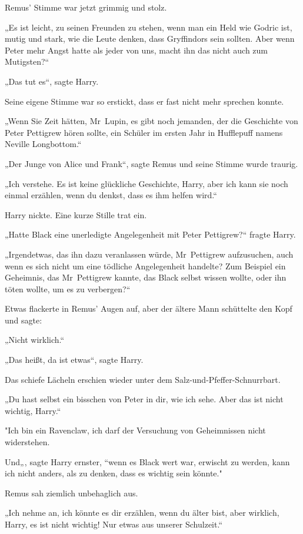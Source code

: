 {Remus' Stimme war jetzt grimmig und stolz.

„Es ist leicht, zu seinen Freunden zu stehen, wenn man ein Held wie Godric ist, mutig und stark, wie die Leute denken, dass Gryffindors sein sollten. Aber wenn Peter mehr Angst hatte als jeder von uns, macht ihn das nicht auch zum Mutigsten?“

„Das tut es“, sagte Harry.

Seine eigene Stimme war so erstickt, dass er fast nicht mehr sprechen konnte.

„Wenn Sie Zeit hätten, Mr~Lupin, es gibt noch jemanden, der die Geschichte von Peter Pettigrew hören sollte, ein Schüler im ersten Jahr in Hufflepuff namens Neville Longbottom.“

„Der Junge von Alice und Frank“, sagte Remus und seine Stimme wurde traurig.

„Ich verstehe. Es ist keine glückliche Geschichte, Harry, aber ich kann sie noch einmal erzählen, wenn du denkst, dass es ihm helfen wird.“

Harry nickte. Eine kurze Stille trat ein.

„Hatte Black eine unerledigte Angelegenheit mit Peter Pettigrew?“ fragte Harry.

„Irgendetwas, das ihn dazu veranlassen würde, Mr~Pettigrew aufzusuchen, auch wenn es sich nicht um eine tödliche Angelegenheit handelte? Zum Beispiel ein Geheimnis, das Mr~Pettigrew kannte, das Black selbst wissen wollte, oder ihn töten wollte, um es zu verbergen?“

Etwas flackerte in Remus' Augen auf, aber der ältere Mann schüttelte den Kopf und sagte:

„Nicht wirklich.“

„Das heißt, da ist etwas“, sagte Harry.

Das schiefe Lächeln erschien wieder unter dem Salz-und-Pfeffer-Schnurrbart.

„Du hast selbst ein bisschen von Peter in dir, wie ich sehe. Aber das ist nicht wichtig, Harry.“

"Ich bin ein Ravenclaw, ich darf der Versuchung von Geheimnissen nicht widerstehen.

Und„, sagte Harry ernster, “wenn es Black wert war, erwischt zu werden, kann ich nicht anders, als zu denken, dass es wichtig sein könnte."

Remus sah ziemlich unbehaglich aus.

„Ich nehme an, ich könnte es dir erzählen, wenn du älter bist, aber wirklich, Harry, es ist nicht wichtig! Nur etwas aus unserer Schulzeit.“

}
